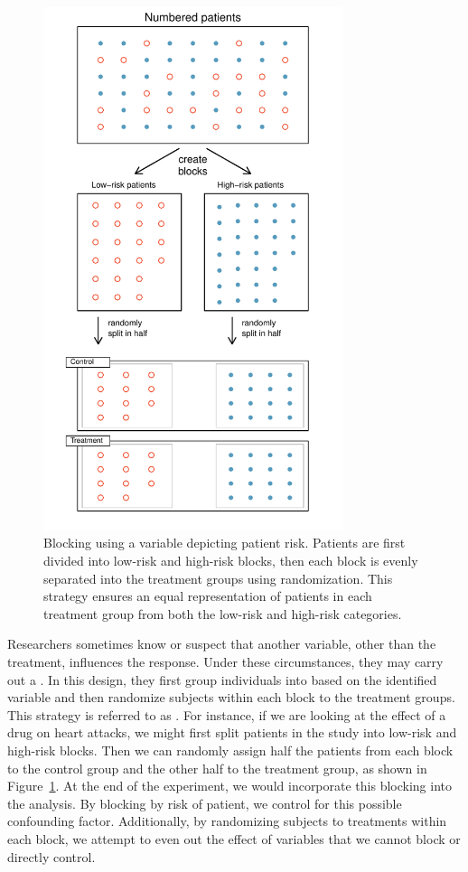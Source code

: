 \begin{figure}
\centering
\includegraphics[width=0.78\textwidth]{ch_data_collection/figures/figureShowingBlocking/figureShowingBlocking}
\caption{Blocking using a variable depicting patient risk. Patients are first divided into low-risk and high-risk blocks, then each block is evenly separated into the treatment groups using randomization. This strategy ensures an equal representation of patients in each treatment group from both the low-risk and high-risk categories.}
\label{figureShowingBlocking}
\end{figure}

Researchers sometimes know or suspect that another variable, other than the treatment, influences the response. Under these circumstances, they may carry out a . In this design, they first group individuals into  based on the identified variable and then randomize subjects within each block to the treatment groups. This strategy is referred to as . For instance, if we are looking at the effect of a drug on heart attacks, we might first split patients in the study into low-risk and high-risk blocks. Then we can randomly assign half the patients from each block to the control group and the other half to the treatment group, as shown in Figure~\ref{figureShowingBlocking}. At the end of the experiment, we would incorporate this blocking into the analysis. By blocking by risk of patient, we control for this possible confounding factor. Additionally, by randomizing subjects to treatments within each block, we attempt to even out the effect of variables that we cannot block or directly control.


